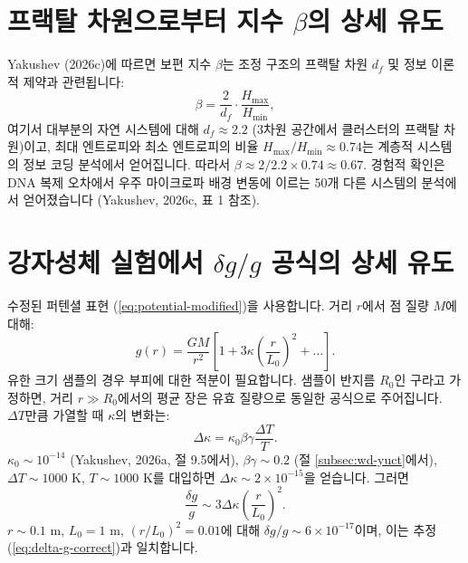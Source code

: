\documentclass[11pt,a4paper]{article}
\newcommand{\df}{d_{\!f}}
\begin{document}
	\appendix
	
	\section{프랙탈 차원으로부터 지수 $\beta$의 상세 유도}
	\label{app:beta-derivation}
	
	Yakushev (2026c)에 따르면 보편 지수 $\beta$는 조정 구조의 프랙탈 차원 $\df$ 및 정보 이론적 제약과 관련됩니다:
	\begin{equation}
		\beta = \frac{2}{\df} \cdot \frac{H_{\text{max}}}{H_{\text{min}}},
		\label{eq:beta-derivation}
	\end{equation}
	여기서 대부분의 자연 시스템에 대해 $\df \approx 2.2$ (3차원 공간에서 클러스터의 프랙탈 차원)이고, 최대 엔트로피와 최소 엔트로피의 비율 $H_{\text{max}}/H_{\text{min}} \approx 0.74$는 계층적 시스템의 정보 코딩 분석에서 얻어집니다. 따라서 $\beta \approx 2/2.2 \times 0.74 \approx 0.67$. 경험적 확인은 DNA 복제 오차에서 우주 마이크로파 배경 변동에 이르는 50개 다른 시스템의 분석에서 얻어졌습니다 (Yakushev, 2026c, 표 1 참조).
	
	\section{강자성체 실험에서 $\delta g/g$ 공식의 상세 유도}
	\label{app:delta-g-derivation}
	
	수정된 퍼텐셜 표현 (\ref{eq:potential-modified})을 사용합니다. 거리 $r$에서 점 질량 $M$에 대해:
	\begin{equation}
		g(r) = \frac{GM}{r^2} \left[ 1 + 3\kappa \left( \frac{r}{L_0} \right)^2 + \dots \right].
		\label{eq:g-modified}
	\end{equation}
	유한 크기 샘플의 경우 부피에 대한 적분이 필요합니다. 샘플이 반지름 $R_0$인 구라고 가정하면, 거리 $r \gg R_0$에서의 평균 장은 유효 질량으로 동일한 공식으로 주어집니다. $\Delta T$만큼 가열할 때 $\kappa$의 변화는:
	\begin{equation}
		\Delta\kappa = \kappa_0 \beta\gamma \frac{\Delta T}{T}.
		\label{eq:delta-kappa}
	\end{equation}
	$\kappa_0 \sim 10^{-14}$ (Yakushev, 2026a, 절 9.5에서), $\beta\gamma \sim 0.2$ (절 \ref{subsec:wd-yuct}에서), $\Delta T \sim 1000$ K, $T \sim 1000$ K를 대입하면 $\Delta\kappa \sim 2\times10^{-15}$을 얻습니다. 그러면
	\begin{equation}
		\frac{\delta g}{g} \sim 3\Delta\kappa \left( \frac{r}{L_0} \right)^2.
		\label{eq:delta-g-final}
	\end{equation}
	$r \sim 0.1$ m, $L_0 = 1$ m, $(r/L_0)^2 = 0.01$에 대해 $\delta g/g \sim 6\times10^{-17}$이며, 이는 추정 (\ref{eq:delta-g-correct})과 일치합니다.
	
\end{document}
